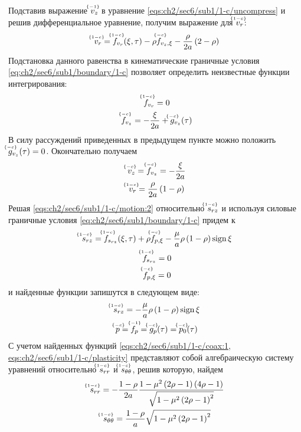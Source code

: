 Подставив выражение $\uindex{v}{-1}_{z}$ в уравнение \cref{eqs:ch2/sec6/sub1/1-c/uncompress} и решив дифференциальное уравнение, получим выражение для $\uindex{v}{1-c}_{r}$:
\begin{equation*}
  \uindex{v}{1-c}_{r} = \uindex{f}{1-c}_{v_{r}}(\xi, \tau) -\rho \uindex{f}{-c}_{v_{z},\xi} - \frac{\rho}{2a}\left(2-\rho\right)
\end{equation*}
Подстановка данного равенства в кинематические граничные условия \cref{eq:ch2/sec6/sub1/boundary/1-c} позволяет определить неизвестные функции интегрирования:
\begin{gather*}
  \uindex{f}{1-c}_{v_{r}} = 0
  \\
  \uindex{f}{-c}_{v_{z}} = -\frac{\xi}{2a} + \uindex{g}{-c}_{v_{z}}(\tau)
\end{gather*}
В силу рассуждений приведенных в предыдущем пункте можно положить $\uindex{g}{-c}_{v_{z}}(\tau) = 0$. Окончательно получаем
\begin{gather}
  \label{sol:ch2/sec6/sub1/vz/-c}
  \uindex{v}{-c}_{z} = \uindex{f}{-c}_{v_{z}} = -\frac{\xi}{2a}
  \\
  \label{sol:ch2/sec6/sub1/vr/1-c}
  \uindex{v}{1-c}_{r} =  \frac{\rho}{2a}\left(1-\rho\right)
\end{gather}
Решая \cref{eqs:ch2/sec6/sub1/1-c/motion:2} относительно $\uindex{s}{1-c}_{rz}$ и используя силовые граничные условия \cref{eq:ch2/sec6/sub1/boundary/1-c} придем к
\begin{gather*}
  \uindex{s}{1-c}_{rz} = \uindex{f}{1-c}_{s_{rz}}(\xi, \tau) + \rho \uindex{f}{-c}_{p,\xi} - \frac{\mu}{a} \rho\left(1-\rho\right)\sign\xi
  \\
  \uindex{f}{1-c}_{s_{rz}} = 0
  \\
  \uindex{f}{-c}_{p,\xi} = 0
\end{gather*}
и найденные функции запишутся в следующем виде:
\begin{gather}
  \label{sol:ch2/sec6/sub1/srz/1-c}
  \uindex{s}{1-c}_{rz} = - \frac{\mu}{a} \rho\left(1-\rho\right)\sign\xi
  \\
  \label{sol:ch2/sec6/sub1/p/-c}
  \uindex{p}{-c}=\uindex{f}{-1}_{p} = \uindex{g}{-c}_{p}(\tau) = \uindex{p}{-c}_{0}(\tau)
\end{gather}
С учетом найденных функций \cref{eqs:ch2/sec6/sub1/1-c/coax:1, eqs:ch2/sec6/sub1/1-c/plasticity} представляют собой алгебраическую систему уравнений относительно $\uindex{s}{1-c}_{rr}$ и $\uindex{s}{1-c}_{\theta\theta}$, решив которую, найдем
\begin{gather}
  \label{sol:ch2/sec6/sub1/srr/1-c}
  \uindex{s}{1-c}_{rr} = -\frac{1-\rho}{2a}\frac{1-\mu^2\left(2\rho-1\right)\left(4\rho-1\right)}{\sqrt{1-\mu^2\left(2\rho-1\right)^2}}
  \\
  \label{sol:ch2/sec6/sub1/stt/1-c}
  \uindex{s}{1-c}_{\theta\theta} = \frac{1-\rho}{a}\sqrt{1-\mu^2\left(2\rho-1\right)^2}
\end{gather}
